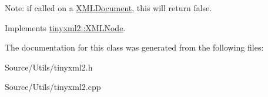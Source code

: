Note\+: if called on a \mbox{\hyperlink{classtinyxml2_1_1_x_m_l_document}{X\+M\+L\+Document}}, this will return false. 

Implements \mbox{\hyperlink{classtinyxml2_1_1_x_m_l_node_a7ce18b751c3ea09eac292dca264f9226}{tinyxml2\+::\+X\+M\+L\+Node}}.



The documentation for this class was generated from the following files\+:\begin{DoxyCompactItemize}
\item 
Source/\+Utils/tinyxml2.\+h\item 
Source/\+Utils/tinyxml2.\+cpp\end{DoxyCompactItemize}
